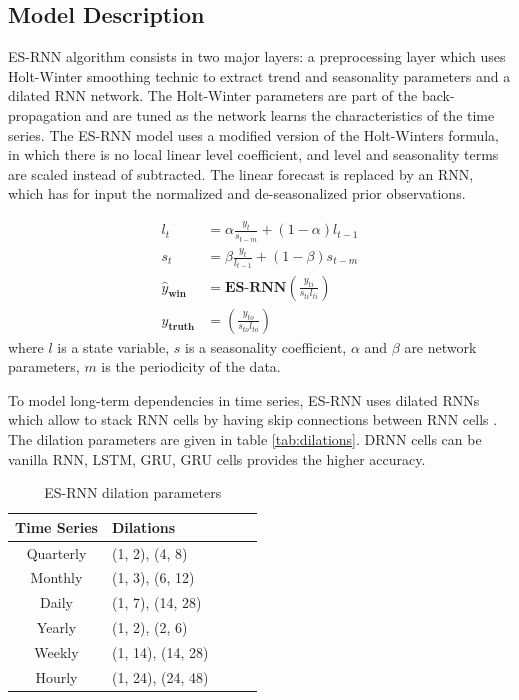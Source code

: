 \documentclass{article}
\begin{document}
\subsection{Model Description}

ES-RNN algorithm consists in two major layers: a preprocessing layer which uses Holt-Winter smoothing technic to extract trend and seasonality parameters and a dilated RNN network.
The Holt-Winter parameters are part of the back-propagation and are tuned as the network learns the characteristics of the time series. The ES-RNN model uses a modified version of the Holt-Winters formula,
in which there is no local linear level coefficient, and level and seasonality terms are scaled instead of subtracted. 
The linear forecast is replaced by an RNN, which has for input the normalized and de-seasonalized prior observations. 


\begin{align*}
	l_t 	&= \alpha \frac{y_t} {s_{t-m}} + (1-\alpha) l_{t-1} \\
	s_t 	&= \beta \frac{y_t}{l_{t-1}} + (1-\beta) s_{t-m} \\
	\hat{y}_{\textbf{win}}		&= \textbf{ES-RNN}(\frac{y_{ti}}{s_{ti} l_{ti}}) \\
	y_{\textbf{truth}}		&= (\frac{y_{to}}{s_{to} l_{to}}) 
\end{align*}
where $l$ is a state variable, $s$ is a seasonality coefficient, $\alpha$ and $\beta$ are network parameters, $m$ is the periodicity of the data.

To model long-term dependencies in time series, ES-RNN uses dilated RNNs which allow to stack RNN cells by having skip connections between RNN cells . 
The dilation parameters  are given in table \autoref{tab:dilations}.  DRNN cells can be vanilla RNN, LSTM, GRU,  GRU cells provides the higher accuracy.

\begin{table}[!ht]
	\centering
	\begin{tabular}{clclc} \toprule
		\textbf{Time Series} & \textbf{Dilations} \\ 
		\midrule
		Quarterly  & (1, 2), (4, 8)	\\
		\midrule
		Monthly 	& (1, 3), (6, 12)	\\
		\midrule
		Daily 	& (1, 7), (14, 28)	\\
		\midrule		
		Yearly 	& (1, 2), (2, 6) 	\\
		\midrule		
		Weekly 	& (1, 14), (14, 28)	\\
		\midrule		
		Hourly 	& (1, 24), (24, 48)	\\
	\end{tabular}
	\caption{ES-RNN dilation parameters}
	\label{tab:dilations}
\end{table}
\end{document}
